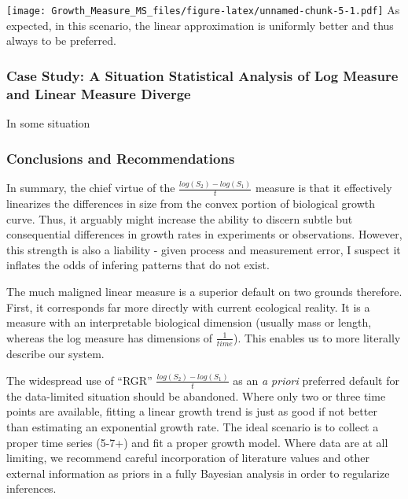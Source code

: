\documentclass[]{article}
\begin{document}
\texttt{[image: Growth\_Measure\_MS\_files/figure-latex/unnamed-chunk-5-1.pdf]}
As expected, in this scenario, the linear approximation is uniformly
better and thus always to be preferred.

\subsubsection{Case Study: A Situation Statistical Analysis of Log
Measure and Linear Measure
Diverge}\label{case-study-a-situation-statistical-analysis-of-log-measure-and-linear-measure-diverge}

In some situation

\subsubsection{Conclusions and
Recommendations}\label{conclusions-and-recommendations}

In summary, the chief virtue of the \(\frac{log(S_2) - log(S_1)}{t}\)
measure is that it effectively linearizes the differences in size from
the convex portion of biological growth curve. Thus, it arguably might
increase the ability to discern subtle but consequential differences in
growth rates in experiments or observations. However, this strength is
also a liability - given process and measurement error, I suspect it
inflates the odds of infering patterns that do not exist.

The much maligned linear measure is a superior default on two grounds
therefore. First, it corresponds far more directly with current
ecological reality. It is a measure with an interpretable biological
dimension (usually mass or length, whereas the log measure has
dimensions of \(\frac{1}{time}\)). This enables us to more literally
describe our system.

The widespread use of ``RGR'' \(\frac{log(S_2) - log(S_1)}{t}\) as an
\emph{a priori} preferred default for the data-limited situation should
be abandoned. Where only two or three time points are available, fitting
a linear growth trend is just as good if not better than estimating an
exponential growth rate. The ideal scenario is to collect a proper time
series (5-7+) and fit a proper growth model. Where data are at all
limiting, we recommend careful incorporation of literature values and
other external information as priors in a fully Bayesian analysis in
order to regularize inferences.
\end{document}
